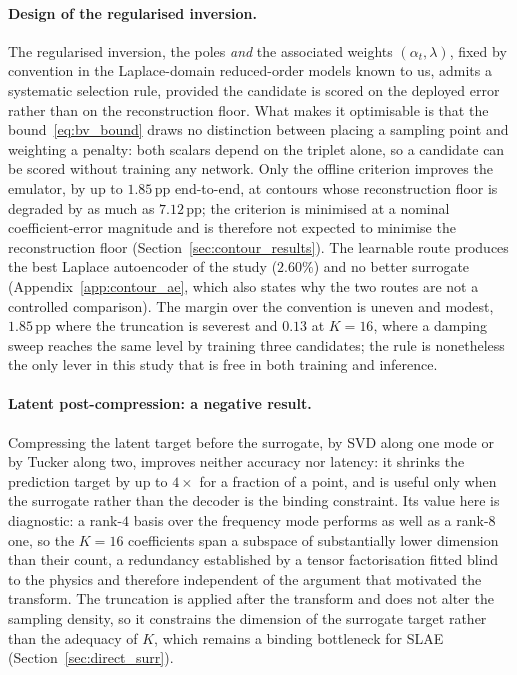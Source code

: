 ﻿\documentclass[a4paper,12pt]{article}
\theoremstyle{definition}
\theoremstyle{remark}
\begin{document}
\paragraph{Design of the regularised inversion.}
The regularised inversion, the poles \emph{and} the associated weights $(\alpha_t, \lambda)$, fixed by convention in the Laplace-domain reduced-order models known to us, admits a systematic selection rule, provided the candidate is scored on the deployed error rather than on the reconstruction floor. What makes it optimisable is that the bound~\eqref{eq:bv_bound} draws no distinction between placing a sampling point and weighting a penalty: both scalars depend on the triplet alone, so a candidate can be scored without training any network. Only the offline criterion improves the emulator, by up to $1.85$\,pp end-to-end, at contours whose reconstruction floor is degraded by as much as $7.12$\,pp; the criterion is minimised at a nominal coefficient-error magnitude and is therefore not expected to minimise the reconstruction floor (Section~\ref{sec:contour_results}). The learnable route produces the best Laplace autoencoder of the study ($2.60\%$) and no better surrogate (Appendix~\ref{app:contour_ae}, which also states why the two routes are not a controlled comparison). The margin over the convention is uneven and modest, $1.85$\,pp where the truncation is severest and $0.13$ at $K=16$, where a damping sweep reaches the same level by training three candidates; the rule is nonetheless the only lever in this study that is free in both training and inference.

\paragraph{Latent post-compression: a negative result.}
Compressing the latent target before the surrogate, by SVD along one mode or by Tucker along two, improves neither accuracy nor latency: it shrinks the prediction target by up to $4\times$ for a fraction of a point, and is useful only when the surrogate rather than the decoder is the binding constraint. Its value here is diagnostic: a rank-$4$ basis over the frequency mode performs as well as a rank-$8$ one, so the $K = 16$ coefficients span a subspace of substantially lower dimension than their count, a redundancy established by a tensor factorisation fitted blind to the physics and therefore independent of the argument that motivated the transform. The truncation is applied after the transform and does not alter the sampling density, so it constrains the dimension of the surrogate target rather than the adequacy of $K$, which remains a binding bottleneck for SLAE (Section~\ref{sec:direct_surr}).
\end{document}
